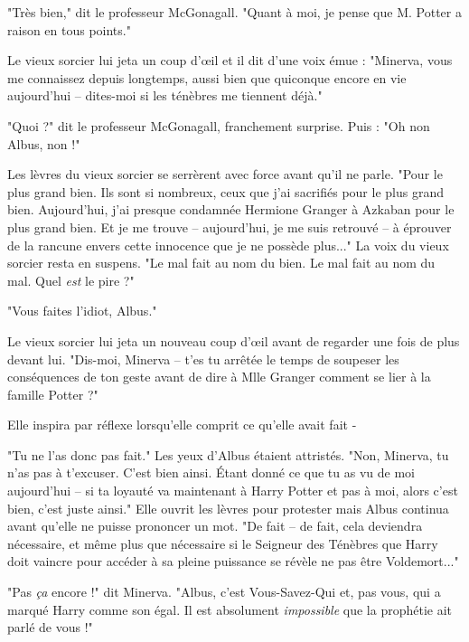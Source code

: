 "Très bien," dit le professeur McGonagall. "Quant à moi, je pense que M. Potter a raison en tous points."

Le vieux sorcier lui jeta un coup d'œil et il dit d'une voix émue : "Minerva, vous me connaissez depuis longtemps, aussi bien que quiconque encore en vie aujourd'hui – dites-moi si les ténèbres me tiennent déjà."

"Quoi ?" dit le professeur McGonagall, franchement surprise. Puis : "Oh non Albus, non !"

Les lèvres du vieux sorcier se serrèrent avec force avant qu'il ne parle. "Pour le plus grand bien. Ils sont si nombreux, ceux que j'ai sacrifiés pour le plus grand bien. Aujourd'hui, j'ai presque condamnée Hermione Granger à Azkaban pour le plus grand bien. Et je me trouve – aujourd'hui, je me suis retrouvé – à éprouver de la rancune envers cette innocence que je ne possède plus..." La voix du vieux sorcier resta en suspens. "Le mal fait au nom du bien. Le mal fait au nom du mal. Quel \emph{est}  le pire ?"

"Vous faites l'idiot, Albus."

Le vieux sorcier lui jeta un nouveau coup d'œil avant de regarder une fois de plus devant lui. "Dis-moi, Minerva – t'es tu arrêtée le temps de soupeser les conséquences de ton geste avant de dire à Mlle Granger comment se lier à la famille Potter ?"

Elle inspira par réflexe lorsqu'elle comprit ce qu'elle avait fait -

"Tu ne l'as donc pas fait." Les yeux d'Albus étaient attristés. "Non, Minerva, tu n'as pas à t'excuser. C'est bien ainsi. Étant donné ce que tu as vu de moi aujourd'hui – si ta loyauté va maintenant à Harry Potter et pas à moi, alors c'est bien, c'est juste ainsi." Elle ouvrit les lèvres pour protester mais Albus continua avant qu'elle ne puisse prononcer un mot. "De fait – de fait, cela deviendra nécessaire, et même plus que nécessaire si le Seigneur des Ténèbres que Harry doit vaincre pour accéder à sa pleine puissance se révèle ne pas être Voldemort..."

"Pas \emph{ça}  encore !" dit Minerva. "Albus, c'est Vous-Savez-Qui et, pas vous, qui a marqué Harry comme son égal. Il est absolument \emph{impossible}  que la prophétie ait parlé de vous !"

